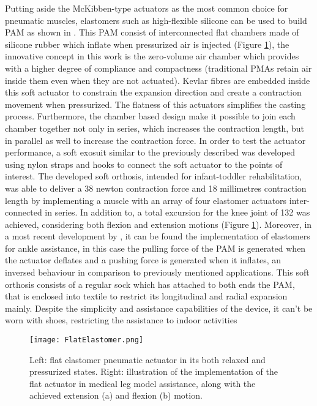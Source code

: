 Putting aside the McKibben-type actuators as the most common choice for pneumatic muscles, elastomers such as high-flexible silicone can be used to build PAM as shown in \cite{Park2014}. This PAM consist of interconnected flat chambers made of silicone rubber which inflate when pressurized air is injected (Figure \ref{fig:Flat_elastomer}), the innovative concept in this work is the zero-volume air chamber which provides with a higher degree of compliance and compactness (traditional PMAs retain air inside them even when they are not actuated). Kevlar fibres are embedded inside this soft actuator to constrain the expansion direction and create a contraction movement when pressurized. The flatness of this actuators simplifies the casting process. Furthermore, the chamber based design make it possible to join each chamber together not only in series, which increases the contraction length, but in parallel as well to increase the contraction force. In order to test the actuator performance, a soft exosuit similar to the previously described was developed using nylon straps and hooks to connect the soft actuator to the points of interest. The developed soft orthosis, intended for infant-toddler rehabilitation, was able to deliver a 38 newton contraction force and 18 millimetres contraction length by implementing a muscle with an array of four elastomer actuators inter-connected in series. In addition to, a total excursion for the knee joint of 132\textdegree{} was achieved, considering both flexion and extension motions (Figure \ref{fig:Flat_elastomer}). Moreover, in a most recent development by \cite{Low2016}, it can be found the implementation of elastomers for ankle assistance, in this case the pulling force of the PAM is generated when the actuator deflates and a pushing force is generated when it inflates, an inversed behaviour in comparison to previously mentioned applications. This soft orthosis consists of a regular sock which has attached to both ends the PAM, that is enclosed into textile to restrict its longitudinal and radial expansion mainly. Despite the simplicity and assistance capabilities of the device, it can't be worn with shoes, restricting the assistance to indoor activities

\begin{figure}[hb!]
    \centering
    \texttt{[image: FlatElastomer.png]}
    \caption{Left: flat elastomer pneumatic actuator in its both relaxed and pressurized states. Right: illustration of the implementation of the flat actuator in medical leg model assistance, along with the achieved extension (a) and flexion (b) motion. \cite{Park2014} }
    \label{fig:Flat_elastomer}
\end{figure}

